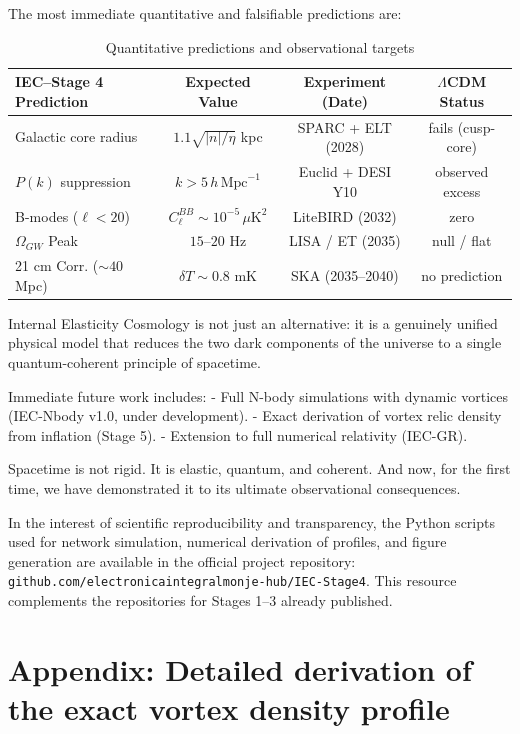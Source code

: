 \documentclass[11pt,a4paper]{article}
\begin{document}
The most immediate quantitative and falsifiable predictions are:

\begin{table}[h]
	\centering
	\caption{Quantitative predictions and observational targets}
	\resizebox{\textwidth}{!}
	{
		\begin{tabular}{lccc}
			\toprule
			IEC--Stage 4 Prediction & Expected Value & Experiment (Date) & $\Lambda$CDM Status \\
			\midrule
			Galactic core radius & $1.1 \sqrt{|n| / \eta}$ kpc & SPARC + ELT (2028) & fails (cusp-core) \\
			$P(k)$ suppression & $k > 5\,h\,\text{Mpc}^{-1}$ & Euclid + DESI Y10 & observed excess \\
			B-modes ($\ell < 20$) & $C_\ell^{BB} \sim 10^{-5}\,\mu\text{K}^2$ & LiteBIRD (2032) & zero \\
			$\Omega_{GW}$ Peak & $15 \text{--} 20$ Hz & LISA / ET (2035) & null / flat \\
			21 cm Corr. ($\sim 40$ Mpc) & $\delta T \sim 0.8$ mK & SKA (2035--2040) & no prediction \\
			\bottomrule
		\end{tabular}
	}
\end{table}

Internal Elasticity Cosmology is not just an alternative: it is a genuinely unified physical model that reduces the two dark components of the universe to a single quantum-coherent principle of spacetime.

Immediate future work includes:
- Full N-body simulations with dynamic vortices (IEC-Nbody v1.0, under development).
- Exact derivation of vortex relic density from inflation (Stage 5).
- Extension to full numerical relativity (IEC-GR).

Spacetime is not rigid.  
It is elastic, quantum, and coherent.  
And now, for the first time, we have demonstrated it to its ultimate observational consequences.

In the interest of scientific reproducibility and transparency, the Python scripts used for network simulation, numerical derivation of profiles, and figure generation are available in the official project repository:
\texttt{github.com/electronicaintegralmonje-hub/IEC-Stage4}. This resource complements the repositories for Stages 1--3 already published.

\appendix
\section{Appendix: Detailed derivation of the exact vortex density profile}
\label{app:exact_profile_appendix}
\end{document}
